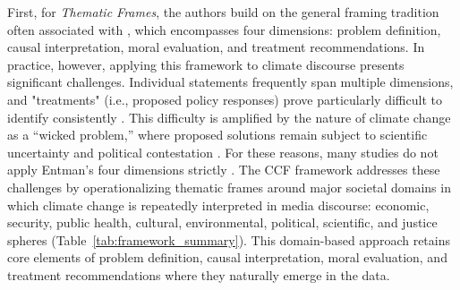 \documentclass[12pt]{article}
\renewcommand\_{\texttt{\detokenize{_}\allowbreak}}
\begin{document}
First, for \emph{Thematic Frames}, the authors build on the general framing tradition often associated with \textcite{entman_framing_1993}, which encompasses four dimensions: problem definition, causal interpretation, moral evaluation, and treatment recommendations. In practice, however, applying this framework to climate discourse presents significant challenges. Individual statements frequently span multiple dimensions, and "treatments" (i.e., proposed policy responses) prove particularly difficult to identify consistently \autocite{grundmann_using_2022}. This difficulty is amplified by the nature of climate change as a ``wicked problem,'' where proposed solutions remain subject to scientific uncertainty and political contestation \autocite{grundmann_climate_2016}. For these reasons, many studies do not apply Entman's four dimensions strictly \autocite{stede_climate_2021}. The CCF framework addresses these challenges by operationalizing thematic frames around major societal domains in which climate change is repeatedly interpreted in media discourse: economic, security, public health, cultural, environmental, political, scientific, and justice spheres (Table~\ref{tab:framework_summary}). This domain-based approach retains core elements of problem definition, causal interpretation, moral evaluation, and treatment recommendations where they naturally emerge in the data.
\end{document}
